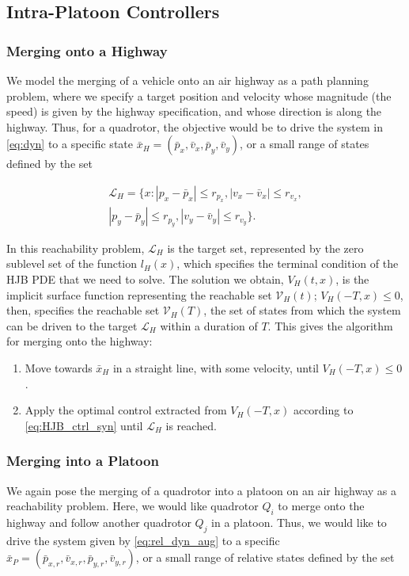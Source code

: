 \subsection{Intra-Platoon Controllers}
\subsubsection{Merging onto a Highway \label{subsec:highway_merge}}
We model the merging of a vehicle onto an air highway as a path planning problem, where we specify a target position and velocity whose magnitude (the speed) is given by the highway specification, and whose direction is along the highway. Thus, for a quadrotor, the objective would be to drive the system in \eqref{eq:dyn} to a specific state $\bar{x}_H=(\bar{p}_x, \bar{v}_x, \bar{p}_y, \bar{v}_y)$, or a small range of states defined by the set

\begin{equation}
\begin{aligned}
\mathcal{L}_H = \{x: |p_x-\bar{p}_x|\le r_{p_x}, |v_x-\bar{v}_x|\le r_{v_x}, \\
|p_y - \bar{p}_y| \le r_{p_y}, |v_y - \bar{v}_y|\le r_{v_y} \}.
\end{aligned}
\end{equation}

In this reachability problem, $\mathcal{L}_H$ is the target set, represented by the zero sublevel set of the function $l_H(x)$, which specifies the terminal condition of the HJB PDE that we need to solve. The solution we obtain, $V_H(t,x)$, is the implicit surface function representing the reachable set $\mathcal V_H(t)$; $V_H(-T,x)\le 0$, then, specifies the reachable set $\mathcal{V}_H(T)$, the set of states from which the system can be driven to the target $\mathcal{L}_H$ within a duration of $T$. This gives the algorithm for merging onto the highway:

\begin{enumerate}
\item Move towards $\bar{x}_H$ in a straight line, with some velocity, until $V_H(-T,x)\le 0$.
\item Apply the optimal control extracted from $V_H(-T,x)$ according to \eqref{eq:HJB_ctrl_syn} until $\mathcal{L}_H$ is reached.
\end{enumerate}

\subsubsection{Merging into a Platoon \label{subsec:platoon_merge}}
We again pose the merging of a quadrotor into a platoon on an air highway as a reachability problem. Here, we would like quadrotor $Q_i$ to merge onto the highway and follow another quadrotor $Q_j$ in a platoon. Thus, we would like to drive the system given by \eqref{eq:rel_dyn_aug} to a specific $\bar{x}_P = (\bar{p}_{x,r}, \bar{v}_{x,r}, \bar{p}_{y,r}, \bar{v}_{y,r})$, or a small range of relative states defined by the set


